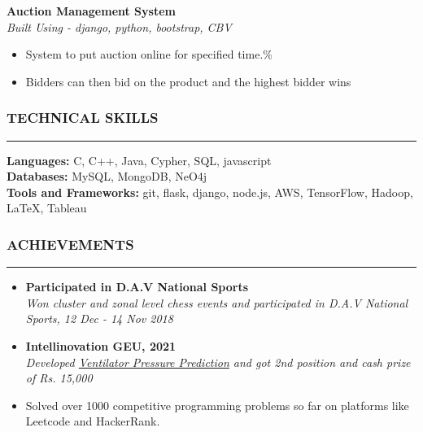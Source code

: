 \documentclass[a4paper]{article}
\begin{document}
\vspace{10pt}
\noindent
\textbf{Auction Management System} \\
\textit{Built Using - django, python, bootstrap, CBV}
\begin{itemize}[leftmargin=*, nosep]
    \item System to put auction online for specified time.\%
    \item Bidders can then bid on the product and the highest bidder wins
\end{itemize}

\subsubsection*{TECHNICAL SKILLS}
\hrule
\vspace{10pt}
\textbf{Languages: } C, C++, Java, Cypher, SQL, javascript \\
\textbf{Databases: } MySQL, MongoDB, NeO4j \\
\textbf{Tools and Frameworks: } git, flask, django, node.js, AWS, TensorFlow, Hadoop, \LaTeX, Tableau

\subsubsection*{ACHIEVEMENTS}
\hrule
\vspace{10pt}

\begin{itemize}[leftmargin=*, nosep]
    \item \noindent \textbf{Participated in D.A.V National Sports} \\
          \textit{Won cluster and zonal level chess events and participated in D.A.V National Sports, 12 Dec - 14 Nov 2018}
    \item \noindent \textbf{Intellinovation GEU, 2021} \\
          \textit{Developed \href{https://www.github.com/Bot-7037/Ventilator-Pressure-Prediction}{Ventilator Pressure Prediction} and got 2nd position and cash prize of Rs. 15,000 }
    \item Solved over 1000 competitive programming problems so far on platforms like Leetcode and HackerRank.
\end{itemize}
\end{document}
